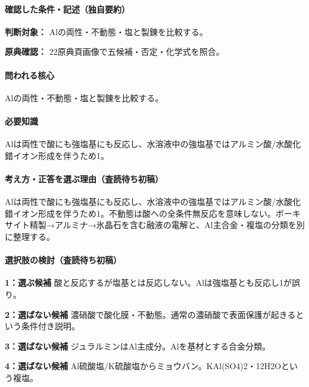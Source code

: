 \paragraph{確認した条件・記述（独自要約）}\mbox{}\par

\noindent\textbf{判断対象：} Alの両性・不動態・塩と製錬を比較する。\par

\noindent\textbf{原典確認：} 22原典頁画像で五候補・否定・化学式を照合。\par

\paragraph{問われる核心} Alの両性・不動態・塩と製錬を比較する。

\paragraph{必要知識} Alは両性で酸にも強塩基にも反応し、水溶液中の強塩基ではアルミン酸/水酸化錯イオン形成を伴うため1。

\paragraph{考え方・正答を選ぶ理由（査読待ち初稿）} Alは両性で酸にも強塩基にも反応し、水溶液中の強塩基ではアルミン酸/水酸化錯イオン形成を伴うため1。不動態は酸への全条件無反応を意味しない。ボーキサイト精製→アルミナ→氷晶石を含む融液の電解と、Al主合金・複塩の分類を別に整理する。

\paragraph{選択肢の検討（査読待ち初稿）}\mbox{}\par

\noindent\textbf{1：選ぶ候補} 酸と反応するが塩基とは反応しない。Alは強塩基とも反応し1が誤り。\par

\noindent\textbf{2：選ばない候補} 濃硝酸で酸化膜・不動態。通常の濃硝酸で表面保護が起きるという条件付き説明。\par

\noindent\textbf{3：選ばない候補} ジュラルミンはAl主成分。Alを基材とする合金分類。\par

\noindent\textbf{4：選ばない候補} Al硫酸塩/K硫酸塩からミョウバン。KAl(SO4)2・12H2Oという複塩。\par

